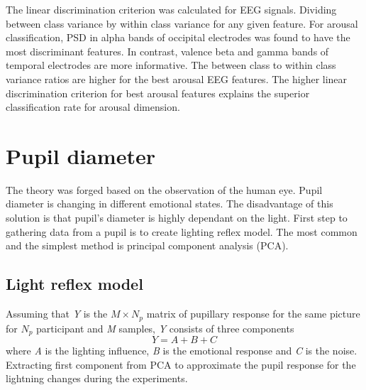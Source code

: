 \documentclass[10pt,journal,compsoc,twoside]{IEEEtran}
\begin{document}
The linear discrimination criterion was calculated for EEG signals. Dividing between class variance by within class variance for any given feature.
For arousal classification, PSD in alpha bands of occipital electrodes was found to have the most discriminant features. In contrast, valence beta and gamma bands of temporal electrodes are more informative. The between class to within class variance ratios are higher for the best arousal EEG features. The higher linear discrimination criterion for best arousal features explains the superior classification rate for arousal dimension.



\section{Pupil diameter}
The theory was forged based on the observation of the human eye. Pupil diameter is changing in different emotional states. The disadvantage of this solution is that pupil's diameter is highly dependant on the light. First step to gathering data from a pupil is to create lighting reflex model. The most common and the simplest method is principal component analysis (PCA).
\subsection{Light reflex model}
Assuming that \textit{Y} is the $M \times N_{p}$ matrix of pupillary response for the same picture for \textit{$N_{p}$} participant and \textit{M} samples, \textit{Y} consists of three components
\begin{equation}
Y = A + B + C
\end{equation}
where \textit{A} is the lighting influence, \textit{B} is the emotional response and \textit{C} is the noise. Extracting first component from PCA to approximate the pupil response for the lightning changes during the experiments.
\end{document}
